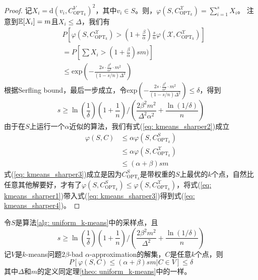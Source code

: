 \begin{proof}
    记$X_i = \text{d}(v_i,C_{\text{OPT}_k}^{V})^2$，其中$v_i \in S$。则，$\varphi(S,C_{\text{OPT}_k}^{\mathcal{X}}) = \sum_{i=1}^s X_i$。 注意到$\mathbb{E}[X_i] = m$且$X_i \leq \Delta$，我们有
    \begin{align}
    & P[\varphi(S,C_{\text{OPT}_k}^\mathcal{X}) > (1+\frac{\beta}{\alpha})\frac{s}{n}\varphi(\mathcal{X},C_{\text{OPT}_k}^\mathcal{X})] \label{eq: kmeans_sharper1} \\
    &= P[\sum X_{i}>(1+\frac{\beta}{\alpha}) s m)] \\
    &\leq \text{exp}(-\frac{2 s \cdot \frac{\beta^2}{\alpha^2} \cdot m^2}{(1-s / n) \Delta^2})
    \end{align}
    根据Serfling bound，最后一步成立，令$\text{exp}(-\frac{2 s \cdot \frac{\beta^2}{\alpha^2} \cdot m^2}{(1-s / n) \Delta^2}) \leq \delta$，得到
    \begin{equation}
    s \geq \ln(\frac{1}{\delta})(1+\frac{1}{n})/(\frac{2\beta^2 m^2}{\Delta^2 \alpha^2}+\frac{\ln(1/\delta)}{n})
    \end{equation}
    由于在$S$上运行一个$\alpha$近似的算法，我们有式(\ref{eq: kmeans_sharper2})成立
    \begin{align}
    \varphi(S,C) &\leq \alpha\varphi(S,C_{\text{OPT}_k}^S) \label{eq: kmeans_sharper2} \\
    &\leq \alpha\varphi(S,C_{\text{OPT}_k}^{\mathcal{X}}) \label{eq: kmeans_sharper3} \\
    &\leq (\alpha + \beta)sm \label{eq: kmeans_sharper4}
    \end{align}
    式(\ref{eq: kmeans_sharper3})成立是因为$C_{\text{OPT}_k}^S$是带权重的$S$上最优的$k$个点，自然比任意其他解要好，才有了$\varphi(S,C_{\text{OPT}_k}^S) \leq \varphi(S,C_{\text{OPT}_k}^\mathcal{X})$，将式(\ref{eq: kmeans_sharper1})带入式(\ref{eq: kmeans_sharper3})得到式(\ref{eq: kmeans_sharper4})。
\end{proof}
\begin{lemma}
    \label{lem: S->C|C in X}
    令$S$是算法\ref{alg: uniform_k-means}中的采样点，且
    \begin{equation}
    s \geq \ln(\frac{1}{\delta})(1+\frac{1}{n})/(\frac{2\beta^2 m^2}{\Delta^2}+\frac{\ln(1/\delta)}{n})
    \end{equation}
    记$V$是$k$-means问题$2\beta$-bad $\alpha$-approximation的解集，$C$是任意$k$个点，则
    \begin{equation}
    P[\varphi(S,C) \leq (\alpha+\beta)sm | C \in V] \leq \delta
    \end{equation}
    其中$\Delta$和$m$的定义同定理\ref{theo: uniform_k-means}中的一样。
\end{lemma}
